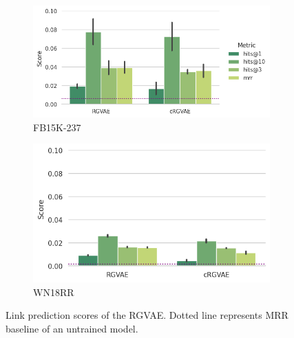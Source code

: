  \begin{figure}[H]
  \begin{subfigure}{.5\textwidth}
    \left
    \includegraphics[height=.5\textwidth, keepaspectratio]{graphs/plots/lp_fb.png}
    \caption{FB15K-237}
    \label{fig5:lpfb}
  \end{subfigure}%
  \begin{subfigure}{.5\textwidth}
    \right
    \includegraphics[height=.5\textwidth, keepaspectratio]{graphs/plots/lp_wn_wol.png}
    \caption{WN18RR}
    \label{fig5:lpwn}
  \end{subfigure}
  \caption{Link prediction scores of the RGVAE. Dotted line represents MRR baseline of an untrained model. }
  \label{fig5:lp_final}
\end{figure}







